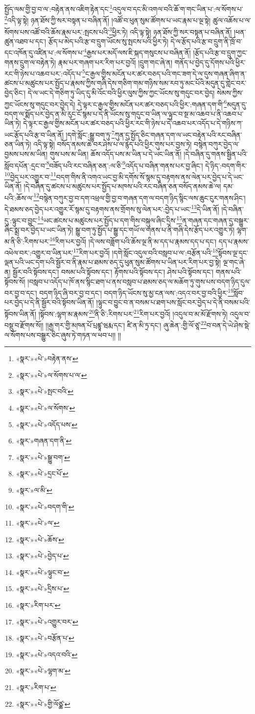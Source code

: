 སྤྱོད་ལམ་གྱི་བྱ་བ་ལ་:བརྟེན་ནས་འཇིག་རྟེན་དང་\footnote{«སྣར་»«པེ་»བརྟེན་ནས་}འདུལ་བ་དང་མི་འགལ་བའི་ཆོ་ག་གང་ཡིན་པ་:ལ་སོགས་པ་\footnote{«སྣར་»«པེ་»ལ་སོགས་པ་ལ་}འདི་ལྟ་སྟེ། ཉན་ཐོས་ཀྱི་སར་བསྟན་པ་བཞིན་ནོ། །འཚོ་བ་ཕུན་སུམ་ཚོགས་པ་ཡང་རྣམ་པ་ལྔ་སྟེ། ཚུལ་འཆོས་པ་ལ་སོགས་པས་འཚོ་བའི་ཆོས་རྣམ་པར་:སྤངས་པའི་\footnote{«སྣར་»«པེ་»སྤང་བའི་}ཕྱིར་ཏེ། འདི་ལྟ་སྟེ། ཉན་ཐོས་ཀྱི་སར་བསྟན་པ་བཞིན་ནོ། །ཕན་ཚུན་འཐབ་པ་དང་། རྩོད་པ་མེད་པའི་རྩ་བ་དྲུག་ཡོངས་སུ་སྤངས་པའི་ཕྱིར་ཏེ། དེ་ལ་རྩོད་པའི་རྩ་བ་དྲུག་ནི་ཁྲོ་བ་དང་འཁོན་དུ་འཛིན་པ་:ལ་སོགས་པ་\footnote{«སྣར་»«པེ་»ལ་སོགས་}རྒྱས་པར་མདོ་ལས་ཇི་སྐད་གསུངས་པ་བཞིན་ནོ། །རྩོད་པའི་རྩ་བ་དྲུག་ཀྱང་གནས་དྲུག་ལ་བརྟེན་ཏེ། རྣམ་པར་གཞག་པར་རིག་པར་བྱའོ། །དྲུག་གང་ཞེ་ན། གནོད་པ་བྱེད་དུ་དོགས་པའི་ཕྱིར་རང་གི་ཉེས་པ་འཆབ་པར་:འདོད་པ་\footnote{«སྣར་»«པེ་»འདོད་པས་}ང་རྒྱལ་གྱིས་མངོན་པར་ཚར་བཅད་པའི་གང་ཟག་དེ་ལ་དུས་གཞན་ཞིག་ན་ཚངས་པ་མཚུངས་པར་སྤྱོད་པ་རྣམས་ཀྱིས་གཞི་དེས་གཅིག་གམ་གཉིས་སམ་རབ་ཏུ་མང་པོའི་མདུན་དུ་གླེང་བར་བྱེད་ཅིང་། དེ་ལ་ཡང་དེ་གཅིག་ཏུ་ཡིད་དུ་མི་འོང་བའི་ཕྱིར་ལུས་ཀྱིས་ཀྱང་ཡོངས་སུ་གདུང་བར་བྱེད། སེམས་ཀྱིས་ཀྱང་ཡོངས་སུ་གདུང་བར་བྱེད་དེ། དེ་ལྟར་ང་རྒྱལ་གྱིས་མངོན་པར་ཚར་བཅད་པའི་ཕྱིར་:གཞན་དག་གི་\footnote{«སྣར་»གཞན་དག་ནི་}མདུན་དུ་བདག་ལ་སྨོད་པར་བྱེད་ན་མི་རུང་ངོ་སྙམ་པ་དེ་ནི་ཡོངས་སུ་གདུང་བ་ཡིན་ལ་ལྟུང་བ་སྔ་མ་འཆབ་པ་ནི་འཆབ་པ་ཡིན་ཏེ། དེ་ལྟར་ང་རྒྱལ་གྱིས་མངོན་པར་ཚར་བཅད་པའི་ཕྱིར་རང་གི་ཉེས་པ་དེ་འཆབ་པར་འདོད་པ་དེ་གཉིས་ཀ་ཡང་རྩོད་པའི་རྩ་བ་ཡིན་ནོ། །དགེ་སློང་:སྒྱུ་བག་ཏུ་\footnote{«སྣར་»«པེ་»སྒྱུ་བག་}ཀུན་དུ་སྤྱོད་ཅིང་གཞན་དག་ལ་ཡང་བརྟེན་པའི་རང་བཞིན་ཅན་ཡིན་ཏེ། འདི་ལྟ་སྟེ། བསོད་ནམས་ཆེ་བར་ཤེས་པ་ལ་རྙེད་པའི་ཕྱིར་གུས་པར་བྱས་ཏེ། བསྙེན་བཀུར་བྱེད་ལ་བྱམས་པས་མ་ཡིན། གུས་པས་མ་ཡིན། ཆོས་འདོད་པས་མ་ཡིན་པ་དེ་ཡང་ཡིན་ནོ། །དེ་བཞིན་དུ་གནས་སྦྱིན་པའི་སློབ་དཔོན་:དྲང་བ་\footnote{«སྣར་»«པེ་»དྲང་པོ་}བཟོད་པའི་རང་བཞིན་ཅན་:ལ་ཅི་\footnote{«སྣར་»ལ་མི་}འདོད་པ་བཞིན་གནས་པར་བྱ་ཞིང་། དེ་ཉིད་:བདག་གིར་\footnote{«སྣར་»«པེ་»བདག་གི་}བྱེད་པར་འགྱུར་བ་\footnote{«སྣར་»«པེ་»ལ་}བདག་གིས་ནི་འགའ་ཡང་བྱ་མི་དགོས་སོ་སྙམ་དུ་བརྟགས་ནས་ལེན་པར་བྱེད་པ་དེ་ཡང་ཡིན་ནོ། །དེ་བཞིན་དུ་ཚངས་པ་མཚུངས་པར་སྤྱོད་པ་མཁས་པའི་རང་བཞིན་ཅན་བསོད་ནམས་ཆེ་ལ། དམ་པའི་:ཆོས་ལ་\footnote{«སྣར་»«པེ་»ཆོས་}བསྙེན་བཀུར་བྱ་བ་དག་འཕྲལ་གྱི་བྱ་བ་གཞན་དག་ལ་བདག་ཉིད་སྙིང་ལས་ཆུང་ངུར་གནས་ཤིང་། དེ་ཐམས་ཅད་བྱེད་པར་འགྱུར་རོ་སྙམ་དུ་བརྟགས་ནས་གྲོགས་སུ་ལེན་པར་:བྱེད་པ་ཡང་\footnote{«སྣར་»«པེ་»བྱེད་པ་}དེ་ཡིན་ནོ། །དེ་བཞིན་དུ་:ལྟུང་བ་བྱུང་\footnote{«སྣར་»«པེ་»ལྟུང་བ་}ཡང་ཚངས་པ་མཚུངས་པར་སྤྱོད་པ་དག་གིས་བསྐུལ་ཞིང་དྲིས་\footnote{«སྣར་»«པེ་»དྲིས་པ་}ན་གཞན་དང་གཞན་དུ་བསྒྱུར་ཞིང་སྨྲ་བར་བྱེད་པ་ཡང་ཡིན་ཏེ། སྒྱུ་བག་ཏུ་སྤྱོད་པ་སྒྱུ་དང་གཡོ་ལ་གནས་པ་ནི་གཞི་དེས་རྩོད་པར་འགྱུར་ཏེ། ལྷག་མ་ནི་ཅི་:རིགས་པར་\footnote{«སྣར་»རིག་པར་}རིག་པར་བྱའོ། །དེ་ལས་བཟློག་པའི་ཆོས་ལྔ་ནི་མ་དད་པ་རྣམས་དད་པ་དང་། དད་པ་རྣམས་འཕེལ་བར་:འགྱུར་བ་ཡིན་པར་\footnote{«སྣར་»«པེ་»འགྱུར་བར་}རིག་པར་བྱའོ། །དགེ་སློང་འདུལ་བའི་བསླབ་པ་ལ་:བརྩོན་པའི་\footnote{«སྣར་»«པེ་»བརྩོན་པ་}སྟོབས་ལྔ་དང་ལྡན་པའི་ཡང་དག་པའི་སྦྱོར་བ་ནི་རྣམ་པ་ཐམས་ཅད་དུ་ཕུན་སུམ་ཚོགས་པ་ཡིན་པར་རིག་པར་བྱ་སྟེ། ལྔ་གང་ཞེ་ན། སྦྱོར་བའི་སྟོབས་དང་། བསམ་པའི་སྟོབས་དང་། རྟོགས་པའི་སྟོབས་དང་། ཤེས་པའི་སྟོབས་དང་། གནས་པའི་སྟོབས་སོ། །བསླབ་པ་འདོད་པ་ཁོ་ནས་སྙིང་ཐག་པ་ནས་བསླབ་པ་ཐམས་ཅད་ལ་མཆོག་ཏུ་གུས་པས་བདག་ཉིད་དུལ་བར་བྱ་བ་དང་། བདག་ཉིད་ཞི་བར་བྱ་བ་དང་། བདག་ཉིད་ཡོངས་སུ་མྱ་ངན་ལས་:འདའ་བར་བྱ་བའི་ཕྱིར་\footnote{«སྣར་»«པེ་»འདའ་བའི་}སློབ་པར་བྱེད་པ་དེ་ནི་སྦྱོར་བའི་སྟོབས་ཡིན་ནོ། །ལྟུང་བ་བྱུང་བ་ན་བསམ་པ་ཐག་པས་སློང་བར་བྱེད་པ་དེ་ནི་བསམ་པའི་སྟོབས་ཡིན་ནོ། །སྟོབས་:ལྷག་མ་རྣམས་\footnote{«སྣར་»«པེ་»ལྷག་མ་}ནི་ཅི་:རིགས་པར་\footnote{«སྣར་»རིག་པ་}རིག་པར་བྱའོ། །འདུལ་བ་མ་མོ་རྫོགས་ཏེ། འདུལ་བ་བསྡུ་བ་རྫོགས་སོ།། །།རྒྱ་གར་གྱི་མཁན་པོ་པྲཛྙཱ་ཝརྨ་དང་། ཛི་ན་མི་ཏྲ་དང་། ཞུ་ཆེན་:གྱི་ལོ་ཙཱ་\footnote{«སྣར་»«པེ་»གྱི་ལོཙྪ་}བ་བན་དེ་ཡེ་ཤེས་སྡེ་ལ་སོགས་པས་བསྒྱུར་ཅིང་ཞུས་ཏེ་གཏན་ལ་ཕབ་པ།། །།